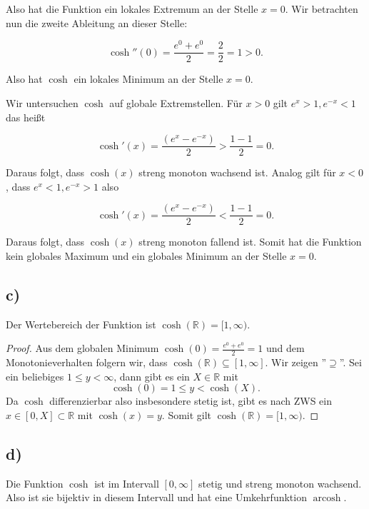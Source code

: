 \documentclass{article}
\newcommand{\RR}{\mathbb{R}}
\DeclareMathOperator{\arcosh}{arcosh}
\begin{document}
Also hat die Funktion ein lokales Extremum an der Stelle
$ x = 0 $.
Wir betrachten nun die zweite Ableitung an dieser Stelle:

\[
\cosh''(0)
=
\frac{e^0 + e^0}{2}
=
\frac{2}{2}
= 1 > 0.
\]

Also hat 
$ \cosh $
ein lokales Minimum an der Stelle
$ x = 0 $.

Wir untersuchen 
$ \cosh $
auf globale Extremstellen.
Für 
$ x > 0 $
gilt
$ e^x > 1, e^{ - x} < 1 $ das heißt

\[
\cosh'(x) = \frac{(e^x - e^{ - x})}{2}
> \frac{1 - 1}{2} = 0.
\]

Daraus folgt, dass 
$ \cosh(x) $ streng monoton wachsend ist.
Analog gilt für
$ x < 0 $,
dass
$ e^x < 1, e^{ - x} > 1 $ also

\[
\cosh'(x) = \frac{(e^x - e^{ - x})}{2}
< \frac{1 - 1}{2} = 0.
\]

Daraus folgt, dass 
$ \cosh(x) $ streng monoton fallend ist.
Somit hat die Funktion kein globales Maximum und ein globales Minimum an der Stelle
$ x = 0 $.

\newpage

\subsection*{c)}
Der Wertebereich der Funktion ist
$ \cosh(\RR) = [1, \infty) $.
\begin{proof}
    Aus dem globalen Minimum
    $ \cosh(0) = \frac{e^0 + e^0}{2} = 1 $
    und dem Monotonieverhalten folgern wir, dass
    $ \cosh(\RR) \subseteq [1,\infty] $.
    Wir zeigen ''$\supseteq$''.
    Sei ein beliebiges
    $ 1 \leq y < \infty $,
    dann gibt es ein
    $ X \in \RR $
    mit
    $$ \cosh(0) = 1 \leq y < \cosh(X). $$
    Da 
    $ \cosh $
    differenzierbar also insbesondere stetig ist, gibt es nach ZWS ein
    $ x \in [0,X] \subset \RR $
    mit
    $ \cosh(x) = y $.
    Somit gilt
    $ \cosh(\RR) = [1, \infty) $.
\end{proof}

\subsection*{d)}

Die Funktion
$ \cosh $
ist im Intervall
$ [0,\infty] $
stetig und streng monoton wachsend.
Also ist sie bijektiv  in diesem Intervall und hat eine Umkehrfunktion
$ \arcosh $.
\end{document}
